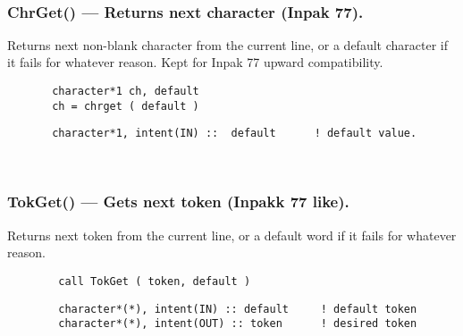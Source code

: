  
\mbox{}\hrulefill\ 
 
  \subsubsection{ChrGet() --- Returns next character (Inpak 77). }

    Returns next non-blank character from the current line, or a default 
    character if it fails for whatever reason.
    Kept for Inpak 77 upward compatibility.
  
\begin{verbatim}       character*1 ch, default
       ch = chrget ( default )\end{verbatim}
\begin{verbatim}       character*1, intent(IN) ::  default      ! default value.
 \end{verbatim}%
 
 
\mbox{}\hrulefill\ 
 
  \subsubsection{TokGet() --- Gets next token (Inpakk 77 like). }

    Returns next token from the current line, or a default 
    word if it fails for whatever reason.
  
\begin{verbatim}        call TokGet ( token, default )\end{verbatim}
\begin{verbatim}
        character*(*), intent(IN) :: default     ! default token
        character*(*), intent(OUT) :: token      ! desired token
\end{verbatim}%
 
